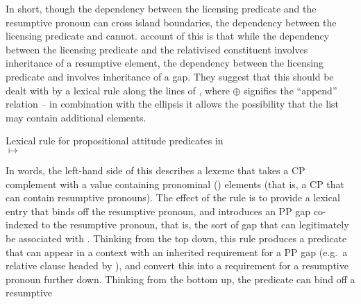 \documentclass[output=paper
 	        ,biblatex
                ,babelshorthands
                ,newtxmath
                ,draftmode
                ,colorlinks, citecolor=brown
]{langscibook}
\begin{document}
In short, though the dependency between the licensing predicate and the resumptive pronoun
can cross island boundaries, the dependency between the licensing predicate and 
cannot.  account of this is that while the dependency between the
licensing predicate and the relativised constituent involves inheritance of a resumptive element, the dependency
between the licensing predicate and  involves inheritance of a gap. They suggest
that this should be dealt with by a lexical rule along the lines of , 
where $\oplus$ signifies the ``append'' relation -- in combination with the ellipsis it allows the possibility that the \comps list may contain additional elements.
\begin{exe}\ex\label{x:rc-79}  Lexical rule for propositional attitude predicates in \\
$\mapsto$\\
\flushright
{}
 \end{exe}
In words, the left-hand side of this describes a lexeme that takes a CP complement with a
 value containing pronominal () elements (that is, a CP that can
contain resumptive pronouns). The effect of the rule is to provide a lexical entry that
binds off the resumptive pronoun, and introduces an PP gap co-indexed to
the resumptive pronoun, that is, the sort of gap that can legitimately be associated with
. Thinking from the top down, this rule produces a predicate that can appear in
a context with an inherited requirement for a PP gap (e.g.\ a relative clause
headed by ), and convert this into a requirement for a resumptive pronoun
further down. Thinking from the bottom up, the predicate can bind off a resumptive
\end{document}
